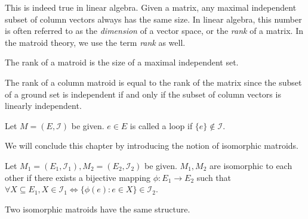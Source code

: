 This is indeed true in linear algebra.
Given a matrix, any maximal independent subset of column vectors always has the same size. In linear algebra, this number is often referred to as the \textit{dimension} of a vector space, or the \textit{rank} of a matrix.
In the matroid theory, we use the term \textit{rank} as well.


\begin{defn}
The rank of a matroid is the size of a maximal independent set.
\end{defn}

The rank of a column matroid is equal to the rank of the matrix since the subset of a ground set is independent if and only if the subset of column vectors is linearly independent.

\begin{defn}
Let $M = (E, \mathcal{I})$ be given.
$e \in E$ is called a loop if $\{ e \} \notin \mathcal{I}$.
\end{defn}

We will conclude this chapter by introducing the notion of isomorphic matroids.
\begin{defn}
Let $M_1 = (E_1, \mathcal{I}_1), M_2 = (E_2, \mathcal{I}_2)$ be given.
$M_1, M_2$ are isomorphic to each other if there exists a bijective mapping $\phi: E_1 \rightarrow E_2$ such that
$\forall X \subseteq E_1, X \in \mathcal{I}_1 \iff \{ \phi(e) : e \in X \} \in \mathcal{I}_2$.
\end{defn}

Two isomorphic matroids have the same structure.
